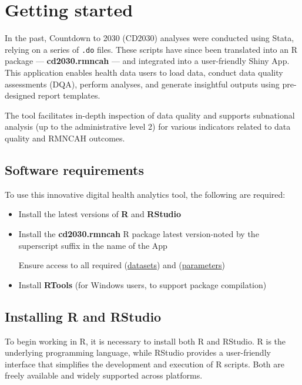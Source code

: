 \documentclass[
  english,
  letterpaper,
  DIV=11,
  numbers=noendperiod]{scrreprt}
\begin{document}
\chapter{Getting started}\label{getting-started}

In the past, Countdown to 2030 (CD2030) analyses were conducted using
Stata, relying on a series of \texttt{.do} files. These scripts have
since been translated into an R package --- \textbf{cd2030.rmncah} ---
and integrated into a user-friendly Shiny App. This application enables
health data users to load data, conduct data quality assessments (DQA),
perform analyses, and generate insightful outputs using pre-designed
report templates.

The tool facilitates in-depth inspection of data quality and supports
subnational analysis (up to the administrative level 2) for various
indicators related to data quality and RMNCAH outcomes.

\section{Software requirements}\label{sec-software-requirements}

To use this innovative digital health analytics tool, the following are
required:

\begin{itemize}
\item
  Install the latest versions of \textbf{R} and \textbf{RStudio}
\item
  Install the \textbf{cd2030.rmncah} R package latest version-noted by
  the superscript suffix in the name of the App

  Ensure access to all required
  (\hyperref[sec-data-requirements]{datasets}) and
  (\hyperref[sec-denom-analysis-setup]{parameters})
\item
  Install \textbf{RTools} (for Windows users, to support package
  compilation)
\end{itemize}

\section{Installing R and RStudio}\label{sec-instal-r}

To begin working in R, it is necessary to install both R and RStudio. R
is the underlying programming language, while RStudio provides a
user-friendly interface that simplifies the development and execution of
R scripts. Both are freely available and widely supported across
platforms.
\end{document}
